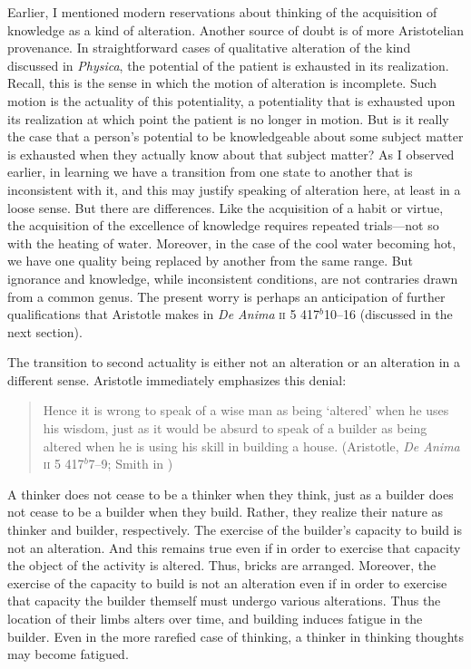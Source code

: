 Earlier, I mentioned modern reservations about thinking of the acquisition of knowledge as a kind of alteration. Another source of doubt is of more Aristotelian provenance. In straightforward cases of qualitative alteration of the kind discussed in \emph{Physica}, the potential of the patient is exhausted in its realization. Recall, this is the sense in which the motion of alteration is incomplete. Such motion is the actuality of this potentiality, a potentiality that is exhausted upon its realization at which point the patient is no longer in motion. But is it really the case that a person's potential to be knowledgeable about some subject matter is exhausted when they actually know about that subject matter? As I observed earlier, in learning we have a transition from one state to another that is inconsistent with it, and this may justify speaking of alteration here, at least in a loose sense. But there are differences. Like the acquisition of a habit or virtue, the acquisition of the excellence of knowledge requires repeated trials---not so with the heating of water. Moreover, in the case of the cool water becoming hot, we have one quality being replaced by another from the same range. But ignorance and knowledge, while inconsistent conditions, are not contraries drawn from a common genus. The present worry is perhaps an anticipation of further qualifications that Aristotle makes in \emph{De Anima} \textsc{ii} 5 417\( ^{b} \)10--16 (discussed in the next section).

The transition to second actuality is either not an alteration or an alteration in a different sense. Aristotle immediately emphasizes this denial:
\begin{quote}
	Hence it is wrong to speak of a wise man as being `altered' when he uses his wisdom, just as it would be absurd to speak of a builder as being altered when he is using his skill in building a house. (Aristotle, \emph{De Anima} \textsc{ii} 5 417\( ^{b} \)7--9; Smith in \citealt[30]{Barnes:1984uq})
\end{quote}
A thinker does not cease to be a thinker when they think, just as a builder does not cease to be a builder when they build. Rather, they realize their nature as thinker and builder, respectively. The exercise of the builder's capacity to build is not an alteration. And this remains true even if in order to exercise that capacity the object of the activity is altered. Thus, bricks are arranged. Moreover, the exercise of the capacity to build is not an alteration even if in order to exercise that capacity the builder themself must undergo various alterations. Thus the location of their limbs alters over time, and building induces fatigue in the builder. Even in the more rarefied case of thinking, a thinker in thinking thoughts may become fatigued.

